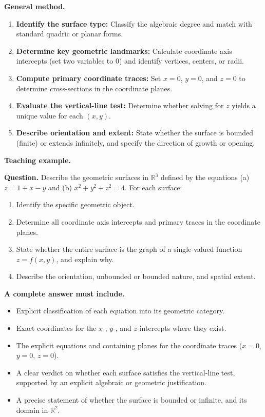 \documentclass[11pt,letterpaper]{article}
\newcommand{\R}{\mathbb{R}}
\begin{document}
\textbf{General method.}
\begin{enumerate}[leftmargin=*,nosep]
    \item \textbf{Identify the surface type:} Classify the algebraic degree and match with standard quadric or planar forms.
    \item \textbf{Determine key geometric landmarks:} Calculate coordinate axis intercepts (set two variables to 0) and identify vertices, centers, or radii.
    \item \textbf{Compute primary coordinate traces:} Set $x=0$, $y=0$, and $z=0$ to determine cross-sections in the coordinate planes.
    \item \textbf{Evaluate the vertical-line test:} Determine whether solving for $z$ yields a unique value for each $(x,y)$.
    \item \textbf{Describe orientation and extent:} State whether the surface is bounded (finite) or extends infinitely, and specify the direction of growth or opening.
\end{enumerate}

\textbf{Teaching example.}

\textbf{Question.} 
Describe the geometric surfaces in $\R^3$ defined by the equations (a) $z = 1 + x - y$ and (b) $x^2 + y^2 + z^2 = 4$. For each surface:
\begin{enumerate}[label=(\roman*),nosep]
    \item Identify the specific geometric object.
    \item Determine all coordinate axis intercepts and primary traces in the coordinate planes.
    \item State whether the entire surface is the graph of a single-valued function $z = f(x,y)$, and explain why.
    \item Describe the orientation, unbounded or bounded nature, and spatial extent.
\end{enumerate}

\textbf{A complete answer must include.}
\begin{itemize}[leftmargin=*,nosep]
    \item Explicit classification of each equation into its geometric category.
    \item Exact coordinates for the $x$-, $y$-, and $z$-intercepts where they exist.
    \item The explicit equations and containing planes for the coordinate traces ($x=0$, $y=0$, $z=0$).
    \item A clear verdict on whether each surface satisfies the vertical-line test, supported by an explicit algebraic or geometric justification.
    \item A precise statement of whether the surface is bounded or infinite, and its domain in $\R^2$.
\end{itemize}
\end{document}
